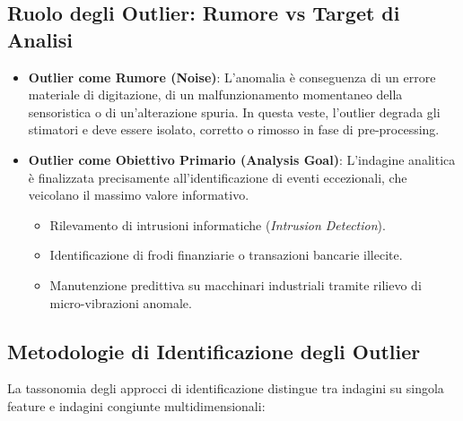 \subsection{Ruolo degli Outlier: Rumore vs Target di Analisi}
\begin{itemize}
    \item \textbf{Outlier come Rumore (Noise)}: L'anomalia è conseguenza di un errore materiale di digitazione, di un malfunzionamento momentaneo della sensoristica o di un'alterazione spuria. In questa veste, l'outlier degrada gli stimatori e deve essere isolato, corretto o rimosso in fase di pre-processing.
    \item \textbf{Outlier come Obiettivo Primario (Analysis Goal)}: L'indagine analitica è finalizzata precisamente all'identificazione di eventi eccezionali, che veicolano il massimo valore informativo.
    \begin{itemize}[noitemsep]
        \item Rilevamento di intrusioni informatiche (\textit{Intrusion Detection}).
        \item Identificazione di frodi finanziarie o transazioni bancarie illecite.
        \item Manutenzione predittiva su macchinari industriali tramite rilievo di micro-vibrazioni anomale.
    \end{itemize}
\end{itemize}

\subsection{Metodologie di Identificazione degli Outlier}

La tassonomia degli approcci di identificazione distingue tra indagini su singola feature e indagini congiunte multidimensionali:

